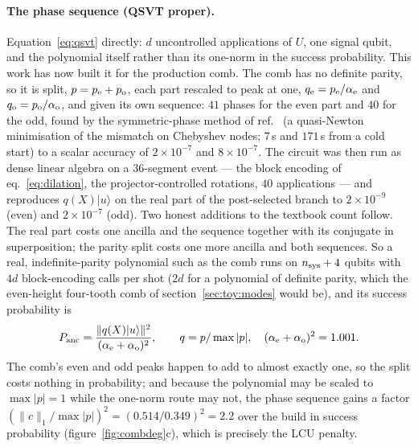 \documentclass[11pt,a4paper]{article}
\begin{document}
\paragraph{The phase sequence (QSVT proper).} Equation~\eqref{eq:qsvt}
directly: $d$ uncontrolled applications of $U$, one signal qubit, and the
polynomial itself rather than its one-norm in the success probability.
This work has now built it for the production comb. The comb has no
definite parity, so it is split, $p=p_{\rm e}+p_{\rm o}$, each part
rescaled to peak at one, $q_{\rm e}=p_{\rm e}/\alpha_{\rm e}$ and
$q_{\rm o}=p_{\rm o}/\alpha_{\rm o}$, and given its own sequence: $41$
phases for the even part and $40$ for the odd, found by the symmetric-phase
method of ref.~\cite{dong2021} (a quasi-Newton minimisation of the mismatch
on Chebyshev nodes; $7$\,s and $171$\,s from a cold start) to a scalar
accuracy of $2\times10^{-7}$ and $8\times10^{-7}$. The circuit was then
run as dense linear algebra on a $36$-segment event --- the block encoding
of eq.~\eqref{eq:dilation}, the projector-controlled rotations, $40$
applications --- and reproduces $q(X)|u\rangle$ on the real part of the
post-selected branch to $2\times10^{-9}$ (even) and $2\times10^{-7}$ (odd).
Two honest additions to the textbook count follow. The real part costs one
ancilla and the sequence together with its conjugate in superposition; the
parity split costs one more ancilla and both sequences. So a real,
indefinite-parity polynomial such as the comb runs on $n_{\rm sys}+4$
qubits with $4d$ block-encoding calls per shot ($2d$ for a polynomial of
definite parity, which the even-height four-tooth comb of
section~\ref{sec:toy:modes} would be), and its success probability is
\begin{equation}
P_{\rm anc}=\frac{\lVert q(X)|u\rangle\rVert^{2}}{(\alpha_{\rm e}+\alpha_{\rm o})^{2}},
\qquad q=p/\max|p|,\quad
(\alpha_{\rm e}+\alpha_{\rm o})^{2}=1.001 .
\label{eq:psucc_phase}
\end{equation}
The comb's even and odd peaks happen to add to almost exactly one, so the
split costs nothing in probability; and because the polynomial may be
scaled to $\max|p|=1$ while the one-norm route may not, the phase sequence
gains a factor $(\lVert c\rVert_1/\max|p|)^{2}=(0.514/0.349)^{2}=2.2$ over
the build in success probability (figure~\ref{fig:combdeg}c), which is
precisely the LCU penalty.
\end{document}
